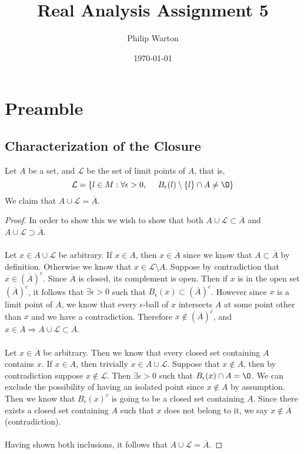 \documentclass{article}
\begin{document}
\title{Real Analysis Assignment 5}
\author{Philip Warton}
\date{\today}
\maketitle
\section*{Preamble}
\subsection*{Characterization of the Closure}
    Let $A$ be a set, and $\mathcal{L}$ be the set of limit points of $A$, that is,
    \[ \mathcal{L} = \{l \in M : \forall \epsilon > 0, \ \ \ \ B_\epsilon(l) \setminus \{l\} \cap A \neq \O \} \]
    We claim that $A \cup \mathcal{L} = \overline{A}$.
    \begin{proof}
        In order to show this we wish to show that both $A \cup \mathcal{L} \subset \overline{A}$ and $A \cup \mathcal{L} \supset \overline{A}$.\\\\
        \fbox{$\subset$} Let $x \in A \cup \mathcal{L}$ be arbitrary. If $x \in A$, then $x \in \overline{A}$ since we know that $A \subset \overline{A}$
        by definition. Otherwise we know that $x \in \mathcal{L} \setminus A$. Suppose by contradiction that $x \in \left(\overline{A}\right)^c$. Since $\overline{A}$ is closed, its complement is open.
        Then if $x$ is in the open set $ \left(\overline{A}\right)^c$, it follows that $\exists \epsilon > 0$ such that $B_\epsilon(x) \subset \left(\overline{A}\right)^c$.
        However since $x$ is a limit point of $A$, we know that every $\epsilon$-ball of $x$ intersects $A$ at some point other than $x$ and we have a
        contradiction. Therefore $x \notin \left(\overline{A}\right)^c$, and $x \in \overline{A} \Longrightarrow A \cup \mathcal{L} \subset \overline{A}$. \\\\
        \fbox{$\supset$} Let $x \in \overline{A}$ be arbitrary. Then we know that every closed set containing $A$ contains $x$. If $x \in A$, then trivially
        $x \in A \cup \mathcal{L}$. Suppose that $x \notin A$, then by contradiction suppose $x \notin \mathcal{L}$. Then $\exists \epsilon > 0$ such that
        $B_\epsilon(x) \cap A = \O$. We can exclude the possibility of having an isolated point since $x \notin A$ by assumption. Then we know that $B_\epsilon(x)^c$
        is going to be a closed set containing $A$. Since there exists a closed set containing $A$ such that $x$ does not belong to it, we say $x \notin \overline{A}$
        (contradiction).\\\\
        Having shown both inclusions, it follows that $A \cup \mathcal{L} = \overline{A}$.
    \end{proof}
\end{document}
